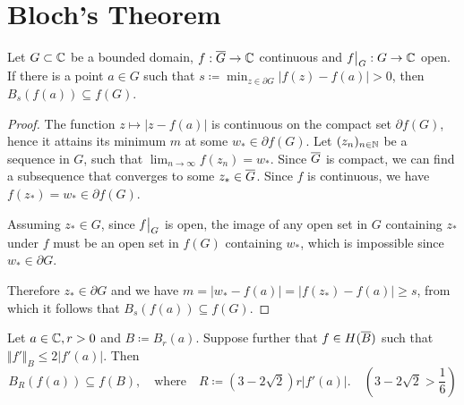 \section{Bloch's Theorem}
\label{sec:blochs-theorem}

\begin{lemma} \label{lem:bloch-lemma-1}
    Let $G \subset \mathbb{C}$ be a bounded domain, $f : \overline{G} \to \mathbb{C}$ continuous and $\restr{f}{G} : G \to \C$ open. If there is a point $a \in G$ such that $s \coloneqq \min_{z \in \partial G} \vert f(z) - f(a) \vert > 0$, then $B_{s}(f(a)) \subseteq f(G)$.
\end{lemma}

\begin{proof}
    The function $z \mapsto \vert z - f(a) \vert$ is continuous on the compact set $\partial f(G)$, hence it attains its minimum $m$ at some $w_* \in \partial f(G)$. Let $(z_n)_{n \in \mathbb{N}}$ be a sequence in $G$, such that $\lim_{n \to \infty} f(z_n) = w_*$. Since $\overline{G}$ is compact, we can find a subsequence that converges to some $z_* \in \overline{G}$. Since $f$ is continuous, we have $f(z_*) = w_* \in \partial f(G)$.

    Assuming $z_* \in G$, since $\restr{f}{G}$ is open, the image of any open set in $G$ containing $z_*$ under $f$ must be an open set in $f(G)$ containing $w_*$, which is impossible since $w_* \in \partial G$.

    Therefore $z_* \in \partial G$ and we have $m = \vert w_* - f(a) \vert = \vert f(z_*) - f(a) \vert \geq s$, from which it follows that $B_{s}(f(a)) \subseteq f(G)$.
\end{proof}

\begin{lemma} \label{lem:bloch-lemma-2}
    Let $a \in \mathbb{C}, r > 0$ and $B \coloneqq B_{r}(a)$. Suppose further that $f \in H(\overline{B})$ such that $\Vert f' \Vert_B \leq 2 \vert f'(a) \vert$. Then
    $$ B_{R}(f(a)) \subseteq f(B), \quad \textrm{where} \quad R \coloneqq (3 - 2 \sqrt{2}) r \vert f'(a) \vert. \quad (3 - 2 \sqrt{2} > {\textstyle\frac{1}{6}}) $$
\end{lemma}

